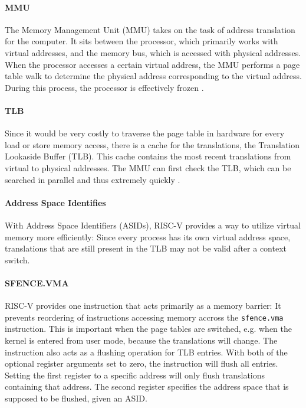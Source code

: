 
\paragraph{MMU}
The Memory Management Unit (MMU) takes on the task of address translation for the computer.
It sits between the processor, which primarily works with virtual addresses, and the memory bus,
which is accessed with physical addresses. When the processor accesses a certain virtual address,
the MMU performs a page table walk to determine the physical address corresponding to the virtual
address. During this process, the processor is effectively frozen \cite{jacobVirtualMemoryContemporary1998}.


\paragraph{TLB} Since it would be very costly to traverse the page table in hardware for every load or store memory access, there is a cache for the translations, the Translation Lookaside Buffer (TLB). This cache contains the most recent translations from virtual to physical addresses. The MMU can first check the TLB, which can be searched in parallel and thus extremely quickly \cite{drepper2007every,jacobVirtualMemoryContemporary1998}.




\paragraph{Address Space Identifies}
With Address Space Identifiers (ASIDs), RISC-V provides a way to utilize virtual memory more efficiently:
Since every process has its own virtual address space, translations that are still present in the
TLB may not be valid after a context switch.

\paragraph{SFENCE.VMA} RISC-V provides one instruction that acts primarily as a memory barrier:
It prevents reordering of instructions accessing memory accross the \texttt{sfence.vma} instruction.
This is important when the page tables are switched, e.g. when the kernel is entered from user mode,
because the translations will change.
The instruction also acts as a flushing operation for TLB entries. With both of the optional register
arguments set to zero, the instruction will flush all entries.
Setting the first register to a specific address will only flush translations containing that address.
The second register specifies the address space that is supposed to be flushed, given an ASID.

